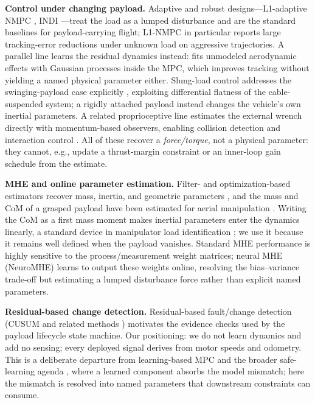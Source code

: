 \documentclass[conference]{IEEEtran}
\begin{document}
\textbf{Control under changing payload.} Adaptive and robust designs---L1-adaptive NMPC
\cite{hanover2021}, INDI \cite{smeur}---treat the load as a lumped disturbance and are the
standard baselines for payload-carrying flight; L1-NMPC in particular reports large
tracking-error reductions under unknown load on aggressive trajectories. A parallel line
learns the residual dynamics instead: \cite{torrente2021} fits unmodeled aerodynamic effects
with Gaussian processes inside the MPC, which improves tracking without yielding a named
physical parameter either. Slung-load control
addresses the swinging-payload case explicitly \cite{sreenath2013}, exploiting differential
flatness of the cable-suspended system; a rigidly attached payload instead changes the
vehicle's own inertial parameters. A related proprioceptive line estimates the external wrench directly with momentum-based
observers, enabling collision detection and interaction control \cite{tomic2017}. All of these
recover a \emph{force/torque}, not a physical parameter: they cannot, e.g., update a
thrust-margin constraint or an inner-loop gain schedule from the estimate.

\textbf{MHE and online parameter estimation.} Filter- and optimization-based estimators
recover mass, inertia, and geometric parameters \cite{svacha2020,wuest2019,bohm2021}, and
the mass and CoM of a grasped payload have been estimated for aerial manipulation
\cite{mellinger2011}. Writing the CoM as a first mass moment makes inertial parameters enter the
dynamics linearly, a standard device in manipulator load identification \cite{atkeson1986}; we
use it because it remains well defined when the payload vanishes.
Standard MHE performance is highly sensitive to the process/measurement weight matrices;
neural MHE (NeuroMHE) \cite{neuromhe} learns to output these weights online, resolving the
bias--variance trade-off but estimating a lumped disturbance force rather than explicit named
parameters.

\textbf{Residual-based change detection.} Residual-based fault/change detection (CUSUM and
related methods \cite{basseville1993}) motivates the evidence checks used by the payload
lifecycle state machine. Our positioning: we do not learn dynamics and add no sensing; every
deployed signal derives from motor speeds and odometry. This is a deliberate
departure from learning-based MPC \cite{hewing} and the broader safe-learning agenda
\cite{brunke}, where a learned component absorbs the model mismatch; here the mismatch is
resolved into named parameters that downstream constraints can consume.
\end{document}
